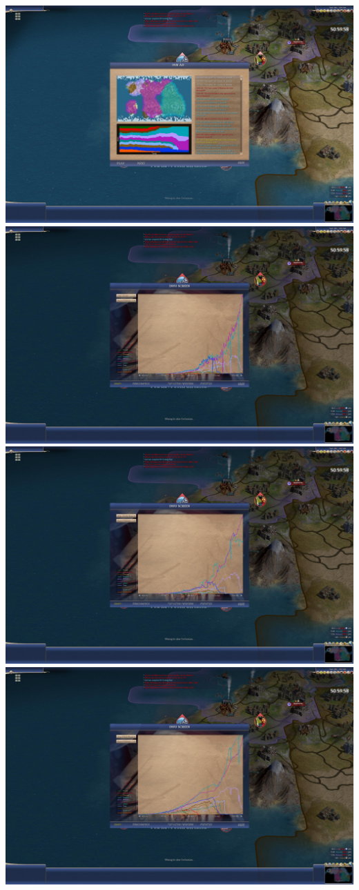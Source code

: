 \documentclass[10pt]{article}
\begin{document}
\includegraphics[width=1.0\textwidth]{end-1}
\includegraphics[width=1.0\textwidth]{end-2}
\includegraphics[width=1.0\textwidth]{end-3}
\includegraphics[width=1.0\textwidth]{end-4}
\end{document}
